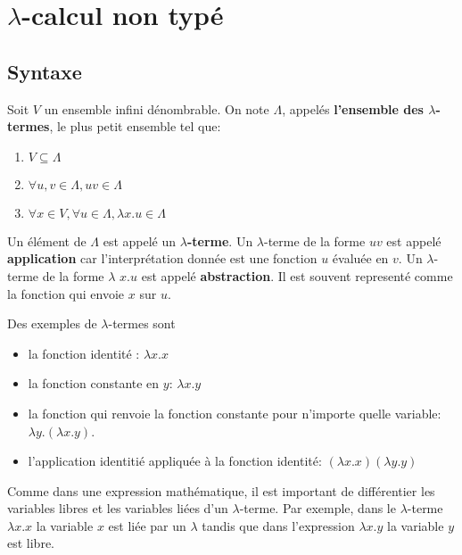 \chapter{$\lambda$-calcul non typé}

\section{Syntaxe}

\begin{definition} 
  Soit $V$ un ensemble infini dénombrable. On note $\Lambda$, appelés \textbf{l'ensemble des $\lambda$-termes}, le plus petit
  ensemble tel que:
  \begin{enumerate}
    \item $V \subseteq \Lambda$
    \item $\forall u, v \in \Lambda, uv \in \Lambda$
    \item $\forall x \in V, \forall u \in \Lambda, \lambda x.u \in \Lambda$
  \end{enumerate}

\end{definition}

Un élément de $\Lambda$ est appelé un \textbf{$\lambda$-terme}.
Un $\lambda$-terme de la forme $uv$ est appelé \textbf{application} car
l'interprétation donnée est une fonction $u$ évaluée en $v$.
Un $\lambda$-terme de la forme $\lambda$ $x.u$ est appelé
\textbf{abstraction}. Il est souvent representé comme la fonction qui envoie
$x$ sur $u$.

Des exemples de $\lambda$-termes sont
\begin{itemize}
  \item la fonction identité : $\lambda x . x$
  \item la fonction constante en $y$: $\lambda x . y$
  \item la fonction qui renvoie la fonction constante pour n'importe quelle
    variable: $\lambda y . (\lambda x . y)$.
  \item l'application identitié appliquée à la fonction identité: $(\lambda x . x)
    (\lambda y . y)$
\end{itemize}

Comme dans une expression mathématique, il est important de différentier les
variables libres et les variables liées d'un $\lambda$-terme. Par exemple, dans
le $\lambda$-terme $\lambda x . x$ la variable $x$ est liée par un $\lambda$
tandis que dans l'expression $\lambda x . y$ la variable $y$ est libre.

